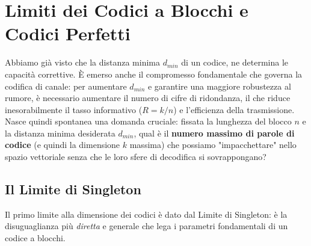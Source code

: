 \section{Limiti dei Codici a Blocchi e Codici Perfetti}
Abbiamo già visto che la distanza minima $d_{min}$ di un codice, ne determina le capacità correttive.
È emerso anche il compromesso fondamentale che governa la codifica di canale: per aumentare $d_{min}$ e garantire una maggiore robustezza al rumore, è necessario aumentare il numero di cifre di ridondanza, il che riduce inesorabilmente il tasso informativo ($R = k/n$) e l'efficienza della trasmissione.
Nasce quindi spontanea una domanda cruciale: fissata la lunghezza del blocco $n$ e la distanza minima desiderata $d_{min}$, qual è il \textbf{numero massimo di parole di codice} (e quindi la dimensione $k$ massima) che possiamo "impacchettare" nello spazio vettoriale senza che le loro sfere di decodifica si sovrappongano?

\subsection{Il Limite di Singleton} %
Il primo limite alla dimensione dei codici è dato dal Limite di Singleton: è la disuguaglianza più \textit{diretta} e generale che lega i parametri fondamentali di un codice a blocchi.

